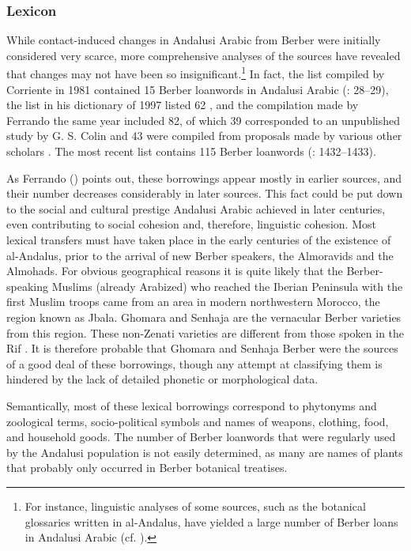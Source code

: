 \documentclass[output=paper,modfonts,nonflat]{langsci/langscibook}
\begin{document}
\subsubsection{Lexicon}

While contact-induced changes in Andalusi Arabic from Berber were initially considered very scarce, more comprehensive analyses of the sources have revealed that changes may not have been so insignificant.\footnote{For instance, linguistic analyses of some sources, such as the botanical glossaries written in al-Andalus, have yielded a large number of Berber loans in Andalusi Arabic (cf. \citealt{Abūl-Ḫayral-Išbīlī2004,Abūl-Ḫayral-Išbīlī2007,Corriente2012}).} In fact, the list compiled by Corriente in 1981 contained 15 Berber loanwords in Andalusi Arabic (\citeyear{Corriente1981}: 28–29), the list in his dictionary of 1997 listed 62 \citep[590]{Corriente1997dictionary}, and the compilation made by Ferrando the same year included 82, of which 39 corresponded to an unpublished study by G. S. Colin and 43 were compiled from proposals made by various other scholars \citep[133]{Ferrando1997}. The most recent list contains 115 Berber loanwords (\citealt{CorrientePereiraVicente2017}: 1432–1433).

As Ferrando (\citeyear[140]{Ferrando1997}) points out, these borrowings appear mostly in earlier sources, and their number decreases considerably in later sources. This fact could be put down to the social and cultural prestige Andalusi Arabic achieved in later centuries, even contributing to social cohesion and, therefore, linguistic cohesion. Most lexical transfers must have taken place in the early centuries of the existence of al-Andalus, prior to the arrival of new Berber speakers, the Almoravids and the Almohads. For obvious geographical reasons it is quite likely that the Berber-speaking Muslims (already Arabized) who reached the Iberian Peninsula with the first Muslim troops came from an area in modern northwestern Morocco, the region known as Jbala. Ghomara and Senhaja are the vernacular Berber varieties from this region. These non-Zenati varieties are different from those spoken in the Rif \citep{Kossmann2017}. It is therefore probable that Ghomara and Senhaja Berber were the sources of a good deal of these borrowings, though any attempt at classifying them is hindered by the lack of detailed phonetic or morphological data. 

Semantically, most of these lexical borrowings correspond to phytonyms and zoological terms, socio-political symbols and names of weapons, clothing, food, and household goods. The number of Berber loanwords that were regularly used by the Andalusi population is not easily determined, as many are names of plants that probably only occurred in Berber botanical treatises. 
\end{document}
